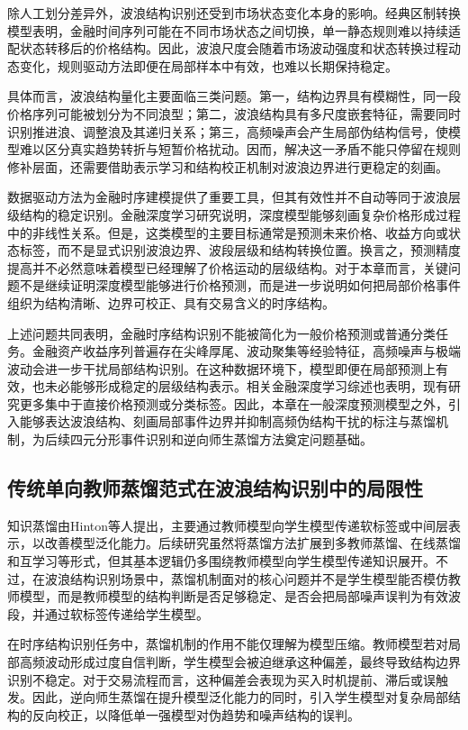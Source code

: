 除人工划分差异外，波浪结构识别还受到市场状态变化本身的影响。经典区制转换模型表明，金融时间序列可能在不同市场状态之间切换，单一静态规则难以持续适配状态转移后的价格结构\cite{hamilton1989regime}。因此，波浪尺度会随着市场波动强度和状态转换过程动态变化，规则驱动方法即便在局部样本中有效，也难以长期保持稳定。

具体而言，波浪结构量化主要面临三类问题。第一，结构边界具有模糊性，同一段价格序列可能被划分为不同浪型；第二，波浪结构具有多尺度嵌套特征，需要同时识别推进浪、调整浪及其递归关系；第三，高频噪声会产生局部伪结构信号，使模型难以区分真实趋势转折与短暂价格扰动。因而，解决这一矛盾不能只停留在规则修补层面，还需要借助表示学习和结构校正机制对波浪边界进行更稳定的刻画。

数据驱动方法为金融时序建模提供了重要工具，但其有效性并不自动等同于波浪层级结构的稳定识别。金融深度学习研究说明，深度模型能够刻画复杂价格形成过程中的非线性关系\cite{sirignano2021universal}。但是，这类模型的主要目标通常是预测未来价格、收益方向或状态标签，而不是显式识别波浪边界、波段层级和结构转换位置。换言之，预测精度提高并不必然意味着模型已经理解了价格运动的层级结构。对于本章而言，关键问题不是继续证明深度模型能够进行价格预测，而是进一步说明如何把局部价格事件组织为结构清晰、边界可校正、具有交易含义的时序结构。

上述问题共同表明，金融时序结构识别不能被简化为一般价格预测或普通分类任务。金融资产收益序列普遍存在尖峰厚尾、波动聚集等经验特征，高频噪声与极端波动会进一步干扰局部结构识别\cite{Cont2001Empirical}。在这种数据环境下，模型即便在局部预测上有效，也未必能够形成稳定的层级结构表示。相关金融深度学习综述也表明，现有研究更多集中于直接价格预测或分类标签\cite{OZBAYOGLU2020106384}。因此，本章在一般深度预测模型之外，引入能够表达波浪结构、刻画局部事件边界并抑制高频伪结构干扰的标注与蒸馏机制，为后续四元分形事件识别和逆向师生蒸馏方法奠定问题基础。

\subsection{传统单向教师蒸馏范式在波浪结构识别中的局限性}

知识蒸馏由Hinton等人提出，主要通过教师模型向学生模型传递软标签或中间层表示，以改善模型泛化能力\cite{hinton2015distilling}。后续研究虽然将蒸馏方法扩展到多教师蒸馏、在线蒸馏和互学习等形式，但其基本逻辑仍多围绕教师模型向学生模型传递知识展开。不过，在波浪结构识别场景中，蒸馏机制面对的核心问题并不是学生模型能否模仿教师模型，而是教师模型的结构判断是否足够稳定、是否会把局部噪声误判为有效波段，并通过软标签传递给学生模型。

在时序结构识别任务中，蒸馏机制的作用不能仅理解为模型压缩。教师模型若对局部高频波动形成过度自信判断，学生模型会被迫继承这种偏差，最终导致结构边界识别不稳定。对于交易流程而言，这种偏差会表现为买入时机提前、滞后或误触发。因此，逆向师生蒸馏在提升模型泛化能力的同时，引入学生模型对复杂局部结构的反向校正，以降低单一强模型对伪趋势和噪声结构的误判。

